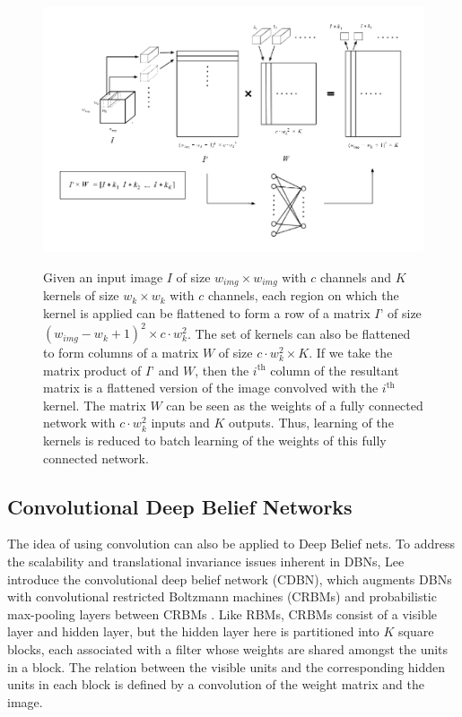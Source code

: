 \documentclass[10pt,twocolumn,letterpaper]{article}
\begin{document}
\begin{figure}
  \includegraphics[width=\textwidth,height=8cm]{convtrans}
  \caption{Given an input image $I$ of size $w_{img} \times w_{img}$ with $c$ channels and $K$ kernels of size
  $w_k \times w_k$ with $c$ channels, each region on which the kernel is applied can be flattened to form a
  row of a matrix $I’$ of size $(w_{img} - w_k + 1)^2 \times c \cdot w_k^2$. The set of kernels can also be
  flattened to form columns of a matrix $W$ of size $c \cdot w_k^2 \times K$. If we take the matrix product
  of $I’$ and $W$, then the $i^\text{th}$ column of the resultant matrix is a flattened version of the image
  convolved with the $i^\text{th}$ kernel. The matrix $W$ can be seen as the weights of a fully connected
  network with $c \cdot w_k^2$ inputs and $K$ outputs. Thus, learning of the kernels is reduced to batch
  learning of the weights of this fully connected network.
}
  \label{fig:convtrans}
\end{figure}

\subsection{Convolutional Deep Belief Networks}

The idea of using convolution can also be applied to Deep Belief nets.
To address the scalability and translational invariance issues inherent in DBNs,
Lee \etal introduce the convolutional deep belief network (CDBN),
which augments DBNs with convolutional restricted Boltzmann machines (CRBMs)
and probabilistic max-pooling layers between CRBMs \cite{CDBN}.
Like RBMs, CRBMs consist of a visible layer and hidden layer, but the hidden
layer here is partitioned into $K$ square blocks, each associated with a filter
whose weights are shared amongst the units in a block.
The relation between the visible units and the corresponding hidden units in each
block is defined by a convolution of the weight matrix and the image.
\end{document}
